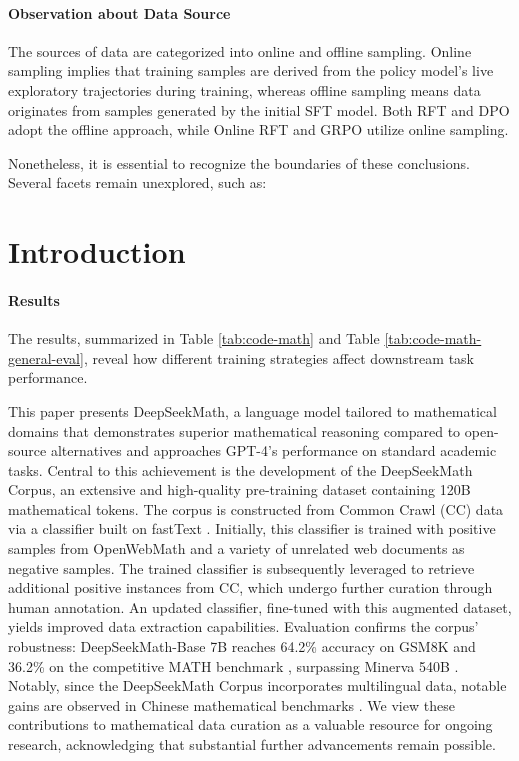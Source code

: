 \begin{itemize}[topsep=0pt]
\paragraph{Observation about Data Source} The sources of data are categorized into online and offline sampling. Online sampling implies that training samples are derived from the policy model's live exploratory trajectories during training, whereas offline sampling means data originates from samples generated by the initial SFT model. Both RFT and DPO adopt the offline approach, while Online RFT and GRPO utilize online sampling.

Nonetheless, it is essential to recognize the boundaries of these conclusions. Several facets remain unexplored, such as:

\section{Introduction}

\paragraph{Results}
The results, summarized in Table \ref{tab:code-math} and Table \ref{tab:code-math-general-eval}, reveal how different training strategies affect downstream task performance.

This paper presents DeepSeekMath, a language model tailored to mathematical domains that demonstrates superior mathematical reasoning compared to open-source alternatives and approaches GPT-4's performance on standard academic tasks. Central to this achievement is the development of the DeepSeekMath Corpus, an extensive and high-quality pre-training dataset containing 120B mathematical tokens. The corpus is constructed from Common Crawl (CC) data via a classifier built on fastText \citep{joulin2016fasttext}. Initially, this classifier is trained with positive samples from OpenWebMath \citep{openwebmath} and a variety of unrelated web documents as negative samples. The trained classifier is subsequently leveraged to retrieve additional positive instances from CC, which undergo further curation through human annotation. An updated classifier, fine-tuned with this augmented dataset, yields improved data extraction capabilities. Evaluation confirms the corpus’ robustness: DeepSeekMath-Base 7B reaches 64.2\% accuracy on GSM8K \citep{gsm8k} and 36.2\% on the competitive MATH benchmark \citep{MATH}, surpassing Minerva 540B \citep{minerva}. Notably, since the DeepSeekMath Corpus incorporates multilingual data, notable gains are observed in Chinese mathematical benchmarks \citep{wei2023cmath,agieval}. We view these contributions to mathematical data curation as a valuable resource for ongoing research, acknowledging that substantial further advancements remain possible.


\end{itemize}
